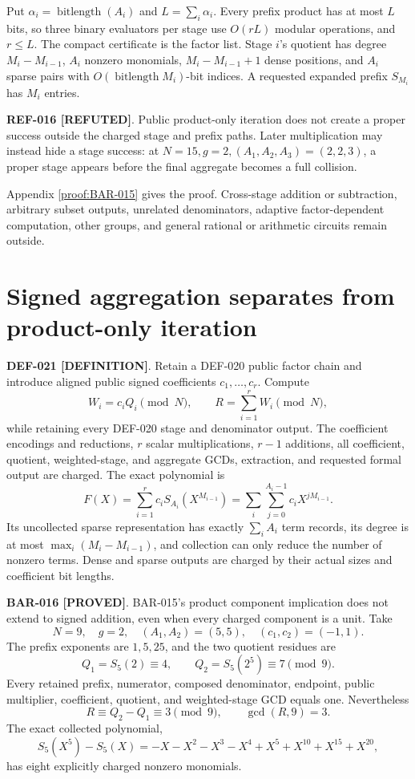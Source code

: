 \documentclass[11pt]{article}
\newcommand{\claimstatus}[2]{\textbf{#1 [#2]}}
\begin{document}
Put \(\alpha_i=\operatorname{bitlength}(A_i)\) and
\(L=\sum_i\alpha_i\). Every prefix product has at most \(L\) bits, so three
binary evaluators per stage use \(O(rL)\) modular operations, and \(r\le L\).
The compact certificate is the factor list. Stage \(i\)'s quotient has degree
\(M_i-M_{i-1}\), \(A_i\) nonzero monomials,
\(M_i-M_{i-1}+1\) dense positions, and \(A_i\) sparse pairs with
\(O(\operatorname{bitlength}M_i)\)-bit indices. A requested expanded prefix
\(S_{M_i}\) has \(M_i\) entries.

\claimstatus{REF-016}{REFUTED}. Public product-only iteration does not create
a proper success outside the charged stage and prefix paths. Later
multiplication may instead hide a stage success: at
\(N=15,g=2,(A_1,A_2,A_3)=(2,2,3)\), a proper stage appears before the final
aggregate becomes a full collision.

Appendix \ref{proof:BAR-015} gives the proof. Cross-stage addition or
subtraction, arbitrary subset outputs, unrelated denominators, adaptive
factor-dependent computation, other groups, and general rational or
arithmetic circuits remain outside.

\section{Signed aggregation separates from product-only iteration}

\claimstatus{DEF-021}{DEFINITION}. Retain a DEF-020 public factor chain and
introduce aligned public signed coefficients \(c_1,\ldots,c_r\). Compute
\[
W_i=c_iQ_i\pmod N,\qquad R=\sum_{i=1}^{r}W_i\pmod N,
\]
while retaining every DEF-020 stage and denominator output. The coefficient
encodings and reductions, \(r\) scalar multiplications, \(r-1\) additions,
all coefficient, quotient, weighted-stage, and aggregate GCDs, extraction,
and requested formal output are charged. The exact polynomial is
\[
F(X)=\sum_{i=1}^{r}c_iS_{A_i}(X^{M_{i-1}})
    =\sum_i\sum_{j=0}^{A_i-1}c_iX^{jM_{i-1}}.
\]
Its uncollected sparse representation has exactly \(\sum_iA_i\) term
records, its degree is at most \(\max_i(M_i-M_{i-1})\), and collection can
only reduce the number of nonzero terms. Dense and sparse outputs are charged
by their actual sizes and coefficient bit lengths.

\claimstatus{BAR-016}{PROVED}. BAR-015's product component implication does
not extend to signed addition, even when every charged component is a unit.
Take
\[
N=9,\quad g=2,\quad(A_1,A_2)=(5,5),\quad(c_1,c_2)=(-1,1).
\]
The prefix exponents are \(1,5,25\), and the two quotient residues are
\[
Q_1=S_5(2)\equiv4,\qquad Q_2=S_5(2^5)\equiv7\pmod9.
\]
Every retained prefix, numerator, composed denominator, endpoint, public
multiplier, coefficient, quotient, and weighted-stage GCD equals one.
Nevertheless
\[
R\equiv Q_2-Q_1\equiv3\pmod9,\qquad\gcd(R,9)=3.
\]
The exact collected polynomial,
\[
S_5(X^5)-S_5(X)
=-X-X^2-X^3-X^4+X^5+X^{10}+X^{15}+X^{20},
\]
has eight explicitly charged nonzero monomials.
\end{document}
